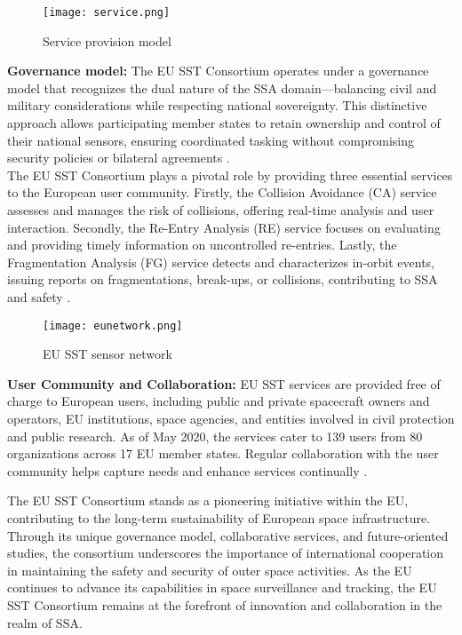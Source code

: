 \begin{figure}[h!]
	\centering
	\texttt{[image: service.png]}
	\caption{Service provision model \cite{esa3}}\label{fig:eusst}
\end{figure}

\textbf{Governance model:} The EU SST Consortium operates under a governance model that recognizes the dual nature of the SSA domain—balancing civil and military considerations while respecting national sovereignty. This distinctive approach allows participating member states to retain ownership and control of their national sensors, ensuring coordinated tasking without compromising security policies or bilateral agreements \cite{esa4}.\\

The EU SST Consortium plays a pivotal role by providing three essential services to the European user community. Firstly, the Collision Avoidance (CA) service assesses and manages the risk of collisions, offering real-time analysis and user interaction. Secondly, the Re-Entry Analysis (RE) service focuses on evaluating and providing timely information on uncontrolled re-entries. Lastly, the Fragmentation Analysis (FG) service detects and characterizes in-orbit events, issuing reports on fragmentations, break-ups, or collisions, contributing to SSA and safety \cite{esa3}.\\

\begin{figure}[h!]
	\centering
	\texttt{[image: eunetwork.png]}
	\caption{EU SST sensor network \cite{esa3}}\label{fig:eusst}
\end{figure}

\textbf{User Community and Collaboration:} EU SST services are provided free of charge to European users, including public and private spacecraft owners and operators, EU institutions, space agencies, and entities involved in civil protection and public research. As of May 2020, the services cater to 139 users from 80 organizations across 17 EU member states. Regular collaboration with the user community helps capture needs and enhance services continually \cite{esa3}.

The EU SST Consortium stands as a pioneering initiative within the EU, contributing to the long-term sustainability of European space infrastructure. Through its unique governance model, collaborative services, and future-oriented studies, the consortium underscores the importance of international cooperation in maintaining the safety and security of outer space activities. As the EU continues to advance its capabilities in space surveillance and tracking, the EU SST Consortium remains at the forefront of innovation and collaboration in the realm of SSA.

